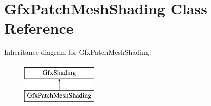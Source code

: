 \hypertarget{class_gfx_patch_mesh_shading}{}\section{Gfx\+Patch\+Mesh\+Shading Class Reference}
\label{class_gfx_patch_mesh_shading}
Inheritance diagram for Gfx\+Patch\+Mesh\+Shading\+:\begin{figure}[H]
\begin{center}
\leavevmode
\includegraphics[height=2.000000cm]{class_gfx_patch_mesh_shading}
\end{center}
\end{figure}
